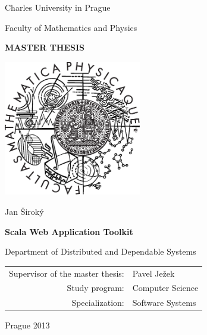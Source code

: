 \documentclass[12pt,a4paper]{report}
\begin{document}



\pagestyle{empty}

\begin{center}
\large Charles University in Prague
\medskip

Faculty of Mathematics and Physics

\vfill

{\bf\Large MASTER THESIS}

\vfill

\centerline{\mbox{\includegraphics[width=60mm]{img/Logo.eps}}}

\vfill

\vspace{5mm}

{\LARGE Jan Široký}

\vspace{15mm}

{\LARGE\bfseries Scala Web Application Toolkit}

\vfill

Department of Distributed and Dependable Systems

\vfill

\begin{tabular}{rl}
Supervisor of the master thesis: & Pavel Ježek \\
\noalign{\vspace{2mm}}
Study program: & Computer Science \\
\noalign{\vspace{2mm}}
Specialization: & Software Systems \\
\end{tabular}

\vfill

Prague 2013
\end{center}
\end{document}
